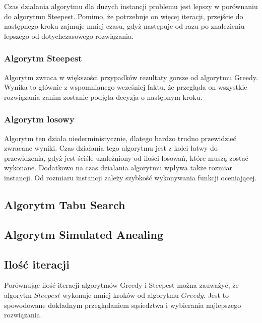 Czas działania algorytmu dla dużych instancji problemu jest lepszy
w porównaniu do algorytmu Steepest. Pomimo, że potrzebuje on
więcej iteracji, przejście do następnego kroku
zajmuje mniej czasu, gdyż następuje od razu po znalezieniu
lepszego od dotychczasowego rozwiązania.

\subsubsection{Algorytm Steepest}

Algorytm zwraca w większości przypadków rezultaty gorsze
od algorytmu Greedy. Wynika to głównie z wspomnianego
wcześniej faktu, że przegląda on
wszystkie rozwiązania zanim zostanie podjęta decyzja o następnym kroku.

\subsubsection{Algorytm losowy}

Algorytm ten działa niederministycznie, dlatego bardzo trudno
przewidzieć zwracane wyniki. Czas działania tego algorytmu
jest z kolei łatwy do przewidzenia, gdyż jest ściśle uzależniony
od ilości losowań, które muszą zostać wykonane. Dodatkowo na czas
działania algorytmu wpływa także rozmiar instancji. Od rozmiaru
instancji zależy szybkość wykonywania funkcji oceniającej.

\subsection {Algorytm Tabu Search}



\subsection {Algorytm Simulated Anealing}

\subsection{Ilość iteracji}

Porównując ilość iteracji algorytmów Greedy i Steepest można zauważyć,
że algorytm $Steepest$ wykonuje mniej kroków od algorytmu $Greedy$.
Jest to spowodowane dokładnym przeglądaniem sąsiedztwa i wybierania
najlepszego rozwiązania.
